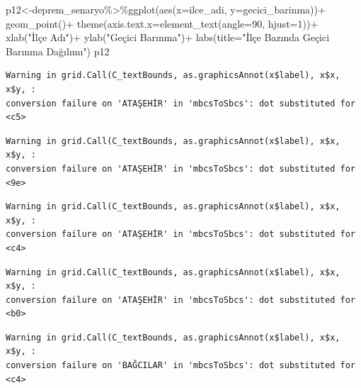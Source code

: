 \documentclass[
  11pt,
  a4paper,
  DIV=11,
  numbers=noendperiod]{scrartcl}
\newenvironment{Shaded}{\begin{snugshade}}{\end{snugshade}}
\newcommand{\AttributeTok}[1]{\textcolor[rgb]{0.40,0.45,0.13}{#1}}
\newcommand{\DecValTok}[1]{\textcolor[rgb]{0.68,0.00,0.00}{#1}}
\newcommand{\FunctionTok}[1]{\textcolor[rgb]{0.28,0.35,0.67}{#1}}
\newcommand{\NormalTok}[1]{\textcolor[rgb]{0.00,0.23,0.31}{#1}}
\newcommand{\OtherTok}[1]{\textcolor[rgb]{0.00,0.23,0.31}{#1}}
\newcommand{\SpecialCharTok}[1]{\textcolor[rgb]{0.37,0.37,0.37}{#1}}
\newcommand{\StringTok}[1]{\textcolor[rgb]{0.13,0.47,0.30}{#1}}
\begin{document}
\begin{Shaded}
\begin{Highlighting}[]
\NormalTok{p12}\OtherTok{\textless{}{-}}\NormalTok{deprem\_senaryo}\SpecialCharTok{\%\textgreater{}\%}\FunctionTok{ggplot}\NormalTok{(}\FunctionTok{aes}\NormalTok{(}\AttributeTok{x=}\NormalTok{ilce\_adi, }\AttributeTok{y=}\NormalTok{gecici\_barinma))}\SpecialCharTok{+}
  \FunctionTok{geom\_point}\NormalTok{()}\SpecialCharTok{+}
  \FunctionTok{theme}\NormalTok{(}\AttributeTok{axis.text.x=}\FunctionTok{element\_text}\NormalTok{(}\AttributeTok{angle=}\DecValTok{90}\NormalTok{, }\AttributeTok{hjust=}\DecValTok{1}\NormalTok{))}\SpecialCharTok{+}
  \FunctionTok{xlab}\NormalTok{(}\StringTok{"İlçe Adı"}\NormalTok{)}\SpecialCharTok{+}
  \FunctionTok{ylab}\NormalTok{(}\StringTok{"Geçici Barınma"}\NormalTok{)}\SpecialCharTok{+}
  \FunctionTok{labs}\NormalTok{(}\AttributeTok{title=}\StringTok{"İlçe Bazında Geçici Barınma Dağılımı"}\NormalTok{)}
\NormalTok{p12}
\end{Highlighting}
\end{Shaded}

\begin{verbatim}
Warning in grid.Call(C_textBounds, as.graphicsAnnot(x$label), x$x, x$y, :
conversion failure on 'ATAŞEHİR' in 'mbcsToSbcs': dot substituted for <c5>
\end{verbatim}

\begin{verbatim}
Warning in grid.Call(C_textBounds, as.graphicsAnnot(x$label), x$x, x$y, :
conversion failure on 'ATAŞEHİR' in 'mbcsToSbcs': dot substituted for <9e>
\end{verbatim}

\begin{verbatim}
Warning in grid.Call(C_textBounds, as.graphicsAnnot(x$label), x$x, x$y, :
conversion failure on 'ATAŞEHİR' in 'mbcsToSbcs': dot substituted for <c4>
\end{verbatim}

\begin{verbatim}
Warning in grid.Call(C_textBounds, as.graphicsAnnot(x$label), x$x, x$y, :
conversion failure on 'ATAŞEHİR' in 'mbcsToSbcs': dot substituted for <b0>
\end{verbatim}

\begin{verbatim}
Warning in grid.Call(C_textBounds, as.graphicsAnnot(x$label), x$x, x$y, :
conversion failure on 'BAĞCILAR' in 'mbcsToSbcs': dot substituted for <c4>
\end{verbatim}
\end{document}
